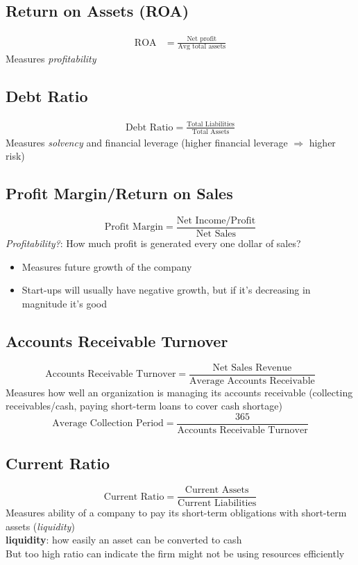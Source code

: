\documentclass{article}
\begin{document}
\begin{multicols}{2}
\subsection{Return on Assets (ROA)}
\begin{equation*}
	\begin{aligned}
		\text{ROA} &= \frac{\text{Net profit}}{\text{Avg total assets}}
	\end{aligned}
\end{equation*}
Measures \textit{profitability}
\subsection{Debt Ratio}
\begin{equation*}
	\begin{aligned}
		\text{Debt Ratio} = \frac{\text{Total Liabilities}}{\text{Total Assets}}
	\end{aligned}
\end{equation*}
Measures \textit{solvency} and financial leverage (higher financial leverage $\Rightarrow$ higher risk)
\subsection{Profit Margin/Return on Sales}
$$\text{Profit Margin} = \frac{\text{Net Income/Profit}}{\text{Net Sales}}$$
\textit{Profitability?}: How much profit is generated every one dollar of sales?
\begin{itemize}
	\item Measures future growth of the company
	\item Start-ups will usually have negative growth, but if it's decreasing in magnitude it's good
\end{itemize}

\subsection{Accounts Receivable Turnover}
$$\text{Accounts Receivable Turnover} = \frac{\text{Net Sales Revenue}}{\text{Average Accounts Receivable}}$$
Measures how well an organization is managing its accounts receivable (collecting receivables/cash, paying short-term loans to cover cash shortage)
$$\text{Average Collection Period} = \frac{365}{\text{Accounts Receivable Turnover}}$$

\subsection{Current Ratio}
$$\text{Current Ratio} = \frac{\text{Current Assets}}{\text{Current Liabilities}}$$
Measures ability of a company to pay its short-term obligations with short-term assets (\textit{liquidity})\\
\textbf{liquidity}: how easily an asset can be converted to cash\\
But too high ratio can indicate the firm might not be using resources efficiently


\end{multicols}
\end{document}

